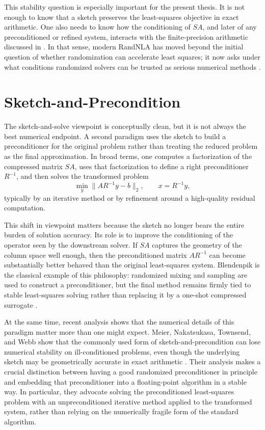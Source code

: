 This stability question is especially important for the present thesis. It is not enough to know that a sketch preserves the least-squares objective in exact arithmetic. One also needs to know how the conditioning of \(SA\), and later of any preconditioned or refined system, interacts with the finite-precision arithmetic discussed in . In that sense, modern RandNLA has moved beyond the initial question of whether randomization can accelerate least squares; it now asks under what conditions randomized solvers can be trusted as serious numerical methods \cite{murray2023randnla,martinsson2020randnla}.

\section{Sketch-and-Precondition}

The sketch-and-solve viewpoint is conceptually clean, but it is not always the best numerical endpoint. A second paradigm uses the sketch to build a preconditioner for the original problem rather than treating the reduced problem as the final approximation. In broad terms, one computes a factorization of the compressed matrix \(SA\), uses that factorization to define a right preconditioner \(R^{-1}\), and then solves the transformed problem
\[
	\min_y \|AR^{-1}y - b\|_2,
	\qquad x = R^{-1}y,
\]
typically by an iterative method or by refinement around a high-quality residual computation.

This shift in viewpoint matters because the sketch no longer bears the entire burden of solution accuracy. Its role is to improve the conditioning of the operator seen by the downstream solver. If \(SA\) captures the geometry of the column space well enough, then the preconditioned matrix \(AR^{-1}\) can become substantially better behaved than the original least-squares system. Blendenpik is the classical example of this philosophy: randomized mixing and sampling are used to construct a preconditioner, but the final method remains firmly tied to stable least-squares solving rather than replacing it by a one-shot compressed surrogate \cite{avron2010blendenpik}.

At the same time, recent analysis shows that the numerical details of this paradigm matter more than one might expect. Meier, Nakatsukasa, Townsend, and Webb show that the commonly used form of sketch-and-precondition can lose numerical stability on ill-conditioned problems, even though the underlying sketch may be geometrically accurate in exact arithmetic \cite{meier2023sketchprecond}. Their analysis makes a crucial distinction between having a good randomized preconditioner in principle and embedding that preconditioner into a floating-point algorithm in a stable way. In particular, they advocate solving the preconditioned least-squares problem with an unpreconditioned iterative method applied to the transformed system, rather than relying on the numerically fragile form of the standard algorithm.

